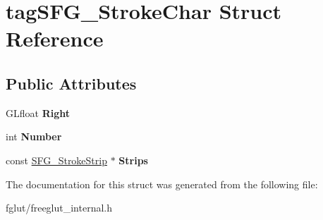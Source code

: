 \hypertarget{structtag_s_f_g___stroke_char}{}\section{tag\+S\+F\+G\+\_\+\+Stroke\+Char Struct Reference}
\label{structtag_s_f_g___stroke_char}
\subsection*{Public Attributes}
\begin{DoxyCompactItemize}
\item 
G\+Lfloat {\bfseries Right}\hypertarget{structtag_s_f_g___stroke_char_a93df6844f67afa1828be18cef1b33504}{}\label{structtag_s_f_g___stroke_char_a93df6844f67afa1828be18cef1b33504}

\item 
int {\bfseries Number}\hypertarget{structtag_s_f_g___stroke_char_a7642fe272407651529ba89f58ec5046a}{}\label{structtag_s_f_g___stroke_char_a7642fe272407651529ba89f58ec5046a}

\item 
const \hyperlink{structtag_s_f_g___stroke_strip}{S\+F\+G\+\_\+\+Stroke\+Strip} $\ast$ {\bfseries Strips}\hypertarget{structtag_s_f_g___stroke_char_aa9d18f84df71cc9fea3cf5ebe3d72091}{}\label{structtag_s_f_g___stroke_char_aa9d18f84df71cc9fea3cf5ebe3d72091}

\end{DoxyCompactItemize}


The documentation for this struct was generated from the following file\+:\begin{DoxyCompactItemize}
\item 
fglut/freeglut\+\_\+internal.\+h\end{DoxyCompactItemize}
